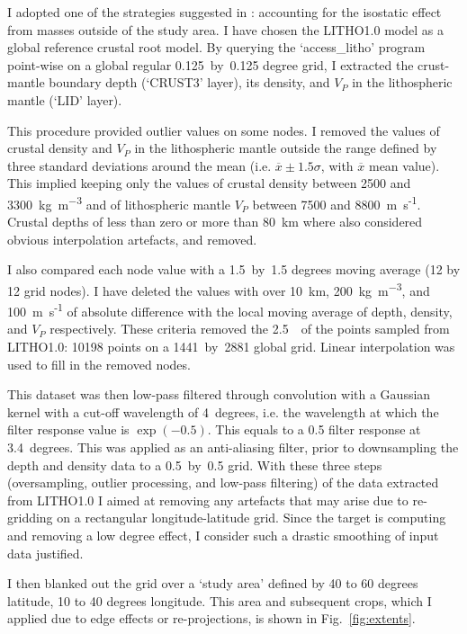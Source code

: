 I adopted one of the strategies suggested in \textcite{Szwillus2016}: accounting for the isostatic effect from masses outside of the study area.
I have chosen the {LITHO1.0} model \parencite{Pasyanos2014} as a global reference crustal root model.
By querying the `{access\_litho}' program point-wise on a global regular {0.125}~by~{0.125} degree grid, I extracted the crust-mantle boundary depth (`CRUST3' layer), its density, and $V_P$ in the lithospheric mantle (`LID' layer).

This procedure provided outlier values on some nodes.
I removed the values of crustal density and $V_P$ in the lithospheric mantle outside the range defined by three standard deviations around the mean (i.e. $\overline{x} \pm 1.5 \sigma $, with $\overline{x}$ mean value).
This implied keeping only the values of crustal density between 2500 and 3300~\si{\kilo \gram \per \cubic \metre} and of lithospheric mantle $V_P$ between 7500 and 8800~{m~s\textsuperscript{-1}}.
Crustal depths of less than zero or more than 80~\si{\kilo \metre} where also considered obvious interpolation artefacts, and removed.

I also compared each node value with a {1.5}~by~{1.5} degrees moving average (12 by 12 grid nodes). I have deleted the values with over 10~\si{\kilo \metre}, 200~\si{\kilo \gram \per \cubic \metre}, and 100~{m~s\textsuperscript{-1}} of absolute difference with the local moving average of depth, density, and $V_P$ respectively.
These criteria removed the {2.5}~\textperthousand~of the points sampled from {LITHO1.0}: 10198 points on a 1441~by~2881 global grid.
Linear interpolation was used to fill in the removed nodes.

This dataset was then low-pass filtered through convolution with a Gaussian kernel with a cut-off wavelength of 4~degrees, i.e. the wavelength at which the filter response value is $\exp(-0.5)$.
This equals to a {0.5} filter response at {3.4}~degrees.
This was applied as an anti-aliasing filter, prior to downsampling the depth and density data to a {0.5}~by~{0.5} grid.
With these three steps (oversampling, outlier processing, and low-pass filtering) of the data extracted from {LITHO1.0} I aimed at removing any artefacts that may arise due to re-gridding on a rectangular longitude-latitude grid.
Since the target is computing and removing a low degree effect, I consider such a drastic smoothing of input data justified.

I then blanked out the grid over a `study area' defined by 40 to 60 degrees latitude, 10 to 40 degrees longitude.
This area and subsequent crops, which I applied due to edge effects or re-projections, is shown in Fig.~\ref{fig:extents}.

